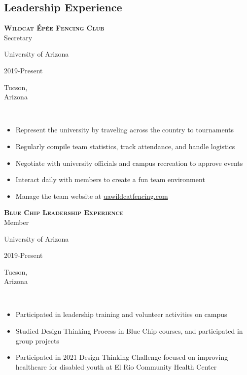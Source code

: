 \documentclass[letterpaper,10pt]{article}
\newcommand{\ua}{University of Arizona}
\newcommand{\town}{Tucson,\\ Arizona}
\newcommand{\wcfsite}{\href{https://www.uawildcatfencing.com}{uawildcatfencing.com}}
\newcommand{\entry}[5]{

    \hfill\vline\hfill
    \begin{minipage}[t]{.80\textwidth}
    
        \textbf{\textsc{#3}}\\
        #4
        
        \footnotesize{#1}
    \end{minipage}
    \hfill\vline\hfill
    \begin{minipage}[t]{.15\textwidth}
        #2
        
        \footnotesize{#5}
    \end{minipage}\\\vspace{.1cm}
}
\begin{document}
\begin{textblock}{10}
		\section{Leadership Experience}
		\vspace{1em}
		\entry{\ua}{2019-Present}{Wildcat Épée Fencing Club}{Secretary}{\town}
		\begin{itemize}
   			\item Represent the university by traveling across the country to tournaments 
   			\item Regularly compile team statistics, track attendance, and handle logistics
   			\item Negotiate with university officials and campus recreation to approve events
    			\item Interact daily with members to create a fun team environment 
			\item Manage the team website at \wcfsite
		\end{itemize}
		\vspace{\baselineskip}
		\entry{\ua}{2019-Present}{Blue Chip Leadership Experience}{Member}{\town}
		\begin{itemize}
			\item Participated in leadership training and volunteer activities on campus
			\item Studied Design Thinking Process in Blue Chip courses, and participated in group projects
			\item Participated in 2021 Design Thinking Challenge focused on improving healthcare for disabled youth at El Rio Community Health Center
		\end{itemize}
	\end{textblock}	
\end{document}
